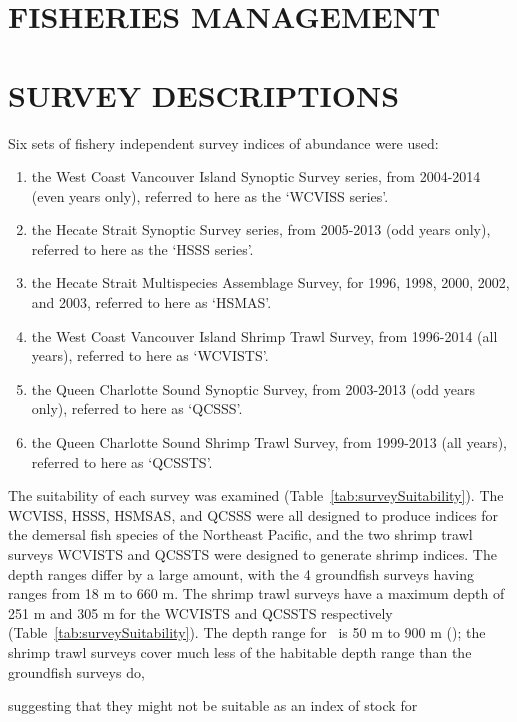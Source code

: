\section{FISHERIES MANAGEMENT}

\clearpage

\section{SURVEY DESCRIPTIONS}

Six sets of fishery independent survey indices of abundance were used:

\begin{enumerate}
  \item the West Coast Vancouver Island Synoptic Survey series, from 2004-2014 (even years only), referred to here as the `WCVISS series'.
  \item the Hecate Strait Synoptic Survey series, from 2005-2013 (odd years only), referred to here as the `HSSS series'.
  \item the Hecate Strait Multispecies Assemblage Survey, for 1996, 1998, 2000, 2002, and 2003, referred to here as `HSMAS'.
  \item the West Coast Vancouver Island Shrimp Trawl Survey, from 1996-2014 (all years), referred to here as `WCVISTS'.
  \item the Queen Charlotte Sound Synoptic Survey, from 2003-2013 (odd years only), referred to here as `QCSSS'.
  \item the Queen Charlotte Sound Shrimp Trawl Survey, from 1999-2013 (all years), referred to here as `QCSSTS'.
\end{enumerate}

The suitability of each survey was examined (Table~\ref{tab:surveySuitability}). The WCVISS, HSSS, HSMSAS, and QCSSS were all designed to produce indices for the demersal fish species of the Northeast Pacific, and the two shrimp trawl surveys WCVISTS and QCSSTS were designed to generate shrimp indices. The depth ranges differ by a large amount, with the 4 groundfish surveys having ranges from 18 m to 660 m. The shrimp trawl surveys have a maximum depth of 251 m and 305 m for the WCVISTS and QCSSTS respectively (Table~\ref{tab:surveySuitability}). The depth range for \fishname\ is 50 m to 900 m (\citet{arf2001}); the shrimp trawl surveys cover much less of the habitable depth range than the groundfish surveys do, 

suggesting that they might not be suitable as an index of stock for

